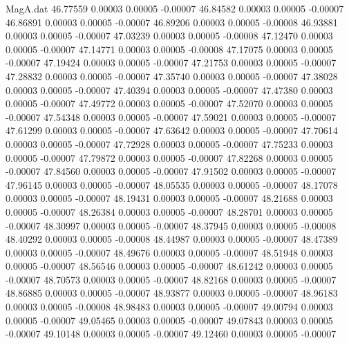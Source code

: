 \begin{filecontents}{MagA.dat}
  46.77559    0.00003    0.00005   -0.00007
  46.84582    0.00003    0.00005   -0.00007
  46.86891    0.00003    0.00005   -0.00007
  46.89206    0.00003    0.00005   -0.00008
  46.93881    0.00003    0.00005   -0.00007
  47.03239    0.00003    0.00005   -0.00008
  47.12470    0.00003    0.00005   -0.00007
  47.14771    0.00003    0.00005   -0.00008
  47.17075    0.00003    0.00005   -0.00007
  47.19424    0.00003    0.00005   -0.00007
  47.21753    0.00003    0.00005   -0.00007
  47.28832    0.00003    0.00005   -0.00007
  47.35740    0.00003    0.00005   -0.00007
  47.38028    0.00003    0.00005   -0.00007
  47.40394    0.00003    0.00005   -0.00007
  47.47380    0.00003    0.00005   -0.00007
  47.49772    0.00003    0.00005   -0.00007
  47.52070    0.00003    0.00005   -0.00007
  47.54348    0.00003    0.00005   -0.00007
  47.59021    0.00003    0.00005   -0.00007
  47.61299    0.00003    0.00005   -0.00007
  47.63642    0.00003    0.00005   -0.00007
  47.70614    0.00003    0.00005   -0.00007
  47.72928    0.00003    0.00005   -0.00007
  47.75233    0.00003    0.00005   -0.00007
  47.79872    0.00003    0.00005   -0.00007
  47.82268    0.00003    0.00005   -0.00007
  47.84560    0.00003    0.00005   -0.00007
  47.91502    0.00003    0.00005   -0.00007
  47.96145    0.00003    0.00005   -0.00007
  48.05535    0.00003    0.00005   -0.00007
  48.17078    0.00003    0.00005   -0.00007
  48.19431    0.00003    0.00005   -0.00007
  48.21688    0.00003    0.00005   -0.00007
  48.26384    0.00003    0.00005   -0.00007
  48.28701    0.00003    0.00005   -0.00007
  48.30997    0.00003    0.00005   -0.00007
  48.37945    0.00003    0.00005   -0.00008
  48.40292    0.00003    0.00005   -0.00008
  48.44987    0.00003    0.00005   -0.00007
  48.47389    0.00003    0.00005   -0.00007
  48.49676    0.00003    0.00005   -0.00007
  48.51948    0.00003    0.00005   -0.00007
  48.56546    0.00003    0.00005   -0.00007
  48.61242    0.00003    0.00005   -0.00007
  48.70573    0.00003    0.00005   -0.00007
  48.82168    0.00003    0.00005   -0.00007
  48.86885    0.00003    0.00005   -0.00007
  48.93877    0.00003    0.00005   -0.00007
  48.96183    0.00003    0.00005   -0.00008
  48.98483    0.00003    0.00005   -0.00007
  49.00794    0.00003    0.00005   -0.00007
  49.05465    0.00003    0.00005   -0.00007
  49.07843    0.00003    0.00005   -0.00007
  49.10148    0.00003    0.00005   -0.00007
  49.12460    0.00003    0.00005   -0.00007
\end{filecontents}
